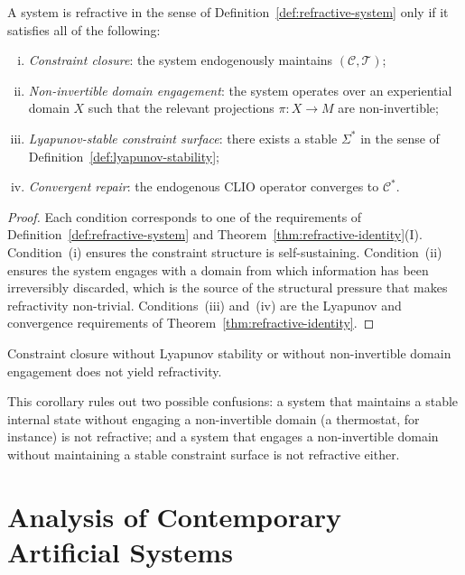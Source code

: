 \documentclass[11pt,openany]{book}
\begin{document}
\begin{proposition}
\label{prop:necessary-refractive}
A system is refractive in the sense of
Definition~\ref{def:refractive-system} only if it satisfies
all of the following:
\begin{enumerate}[(i)]
  \item \emph{Constraint closure}: the system endogenously
    maintains $(\mathcal{C}, \mathcal{T})$;
  \item \emph{Non-invertible domain engagement}: the system
    operates over an experiential domain $X$ such that
    the relevant projections $\pi : X \to M$ are
    non-invertible;
  \item \emph{Lyapunov-stable constraint surface}: there
    exists a stable $\Sigma^*$ in the sense of
    Definition~\ref{def:lyapunov-stability};
  \item \emph{Convergent repair}: the endogenous CLIO
    operator converges to $\mathcal{C}^*$.
\end{enumerate}
\end{proposition}

\begin{proof}
Each condition corresponds to one of the requirements of
Definition~\ref{def:refractive-system} and
Theorem~\ref{thm:refractive-identity}(I).  Condition~(i)
ensures the constraint structure is self-sustaining.
Condition~(ii) ensures the system engages with a domain
from which information has been irreversibly discarded,
which is the source of the structural pressure that makes
refractivity non-trivial.  Conditions~(iii) and~(iv) are
the Lyapunov and convergence requirements of
Theorem~\ref{thm:refractive-identity}.
\end{proof}

\begin{corollary}
Constraint closure without Lyapunov stability or without
non-invertible domain engagement does not yield
refractivity.
\end{corollary}

This corollary rules out two possible confusions: a system
that maintains a stable internal state without engaging a
non-invertible domain (a thermostat, for instance) is not
refractive; and a system that engages a non-invertible
domain without maintaining a stable constraint surface is
not refractive either.

\section{Analysis of Contemporary Artificial Systems}
\label{sec:analysis-ai}
\end{document}
